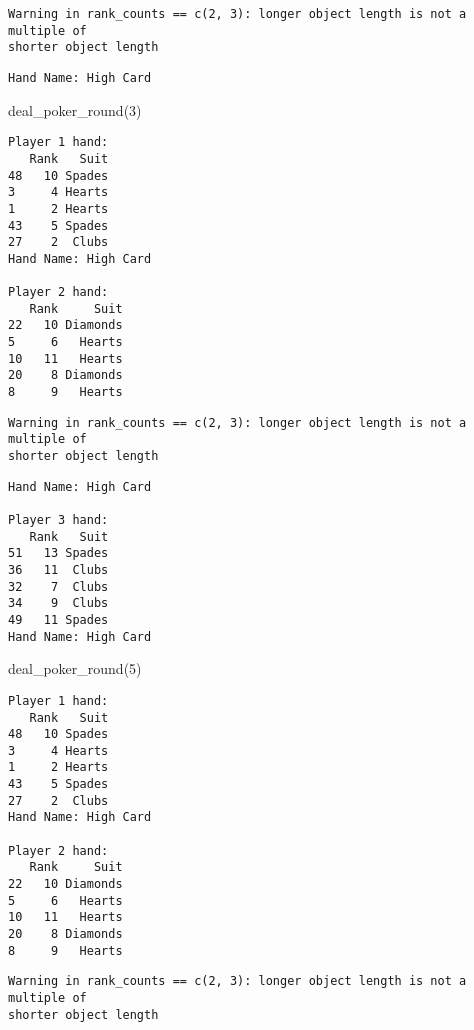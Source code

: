 \documentclass[
  letterpaper,
  DIV=11,
  numbers=noendperiod]{scrartcl}
\newenvironment{Shaded}{\begin{snugshade}}{\end{snugshade}}
\newcommand{\DecValTok}[1]{\textcolor[rgb]{0.68,0.00,0.00}{#1}}
\newcommand{\FunctionTok}[1]{\textcolor[rgb]{0.28,0.35,0.67}{#1}}
\newcommand{\NormalTok}[1]{\textcolor[rgb]{0.00,0.23,0.31}{#1}}
\begin{document}
\begin{verbatim}
Warning in rank_counts == c(2, 3): longer object length is not a multiple of
shorter object length
\end{verbatim}

\begin{verbatim}
Hand Name: High Card 
\end{verbatim}

\begin{Shaded}
\begin{Highlighting}[]
\FunctionTok{deal\_poker\_round}\NormalTok{(}\DecValTok{3}\NormalTok{)}
\end{Highlighting}
\end{Shaded}

\begin{verbatim}
Player 1 hand: 
   Rank   Suit
48   10 Spades
3     4 Hearts
1     2 Hearts
43    5 Spades
27    2  Clubs
Hand Name: High Card 

Player 2 hand: 
   Rank     Suit
22   10 Diamonds
5     6   Hearts
10   11   Hearts
20    8 Diamonds
8     9   Hearts
\end{verbatim}

\begin{verbatim}
Warning in rank_counts == c(2, 3): longer object length is not a multiple of
shorter object length
\end{verbatim}

\begin{verbatim}
Hand Name: High Card 

Player 3 hand: 
   Rank   Suit
51   13 Spades
36   11  Clubs
32    7  Clubs
34    9  Clubs
49   11 Spades
Hand Name: High Card 
\end{verbatim}

\begin{Shaded}
\begin{Highlighting}[]
\FunctionTok{deal\_poker\_round}\NormalTok{(}\DecValTok{5}\NormalTok{)}
\end{Highlighting}
\end{Shaded}

\begin{verbatim}
Player 1 hand: 
   Rank   Suit
48   10 Spades
3     4 Hearts
1     2 Hearts
43    5 Spades
27    2  Clubs
Hand Name: High Card 

Player 2 hand: 
   Rank     Suit
22   10 Diamonds
5     6   Hearts
10   11   Hearts
20    8 Diamonds
8     9   Hearts
\end{verbatim}

\begin{verbatim}
Warning in rank_counts == c(2, 3): longer object length is not a multiple of
shorter object length
\end{verbatim}
\end{document}
